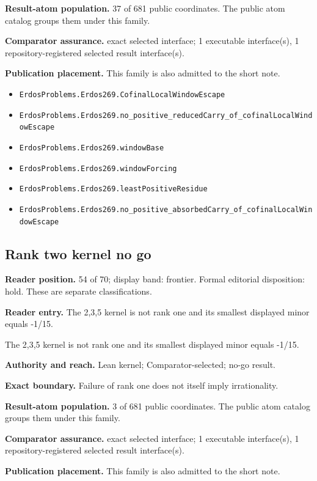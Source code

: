 \documentclass[11pt]{article}
\begin{document}
\textbf{Result-atom population.} 37 of 681 public coordinates. The public atom catalog groups them under this family.

\textbf{Comparator assurance.} exact selected interface; 1 executable interface(s), 1 repository-registered selected result interface(s).

\textbf{Publication placement.} This family is also admitted to the short note.

\begin{itemize}
  \item \nolinkurl{ErdosProblems.Erdos269.CofinalLocalWindowEscape}
  \item \nolinkurl{ErdosProblems.Erdos269.no_positive_reducedCarry_of_cofinalLocalWindowEscape}
  \item \nolinkurl{ErdosProblems.Erdos269.windowBase}
  \item \nolinkurl{ErdosProblems.Erdos269.windowForcing}
  \item \nolinkurl{ErdosProblems.Erdos269.leastPositiveResidue}
  \item \nolinkurl{ErdosProblems.Erdos269.no_positive_absorbedCarry_of_cofinalLocalWindowEscape}
\end{itemize}

\subsection{Rank two kernel no go}
\textbf{Reader position.} 54 of 70; display band: frontier.  Formal editorial disposition: hold.  These are separate classifications.

\textbf{Reader entry.} The 2,3,5 kernel is not rank one and its smallest displayed minor equals -1/15.

The 2,3,5 kernel is not rank one and its smallest displayed minor equals -1/15.

\textbf{Authority and reach.} Lean kernel; Comparator-selected; no-go result.

\textbf{Exact boundary.} Failure of rank one does not itself imply irrationality.

\textbf{Result-atom population.} 3 of 681 public coordinates. The public atom catalog groups them under this family.

\textbf{Comparator assurance.} exact selected interface; 1 executable interface(s), 1 repository-registered selected result interface(s).

\textbf{Publication placement.} This family is also admitted to the short note.
\end{document}
